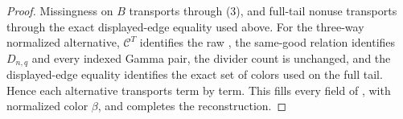 \begin{proof}
Missingness on \(B\) transports through (3), and full-tail nonuse
transports through the exact displayed-edge equality used above.  For the
three-way normalized alternative, \(\mathcal C^T\) identifies the raw
, the same-good relation identifies
\(D_{n,q}\) and every indexed Gamma pair, the divider count is unchanged,
and the displayed-edge equality identifies the exact set of colors used on
the full tail.  Hence each alternative transports term by term.  This
fills every field of
, with normalized
color \(\beta\), and completes the reconstruction.
\end{proof}
